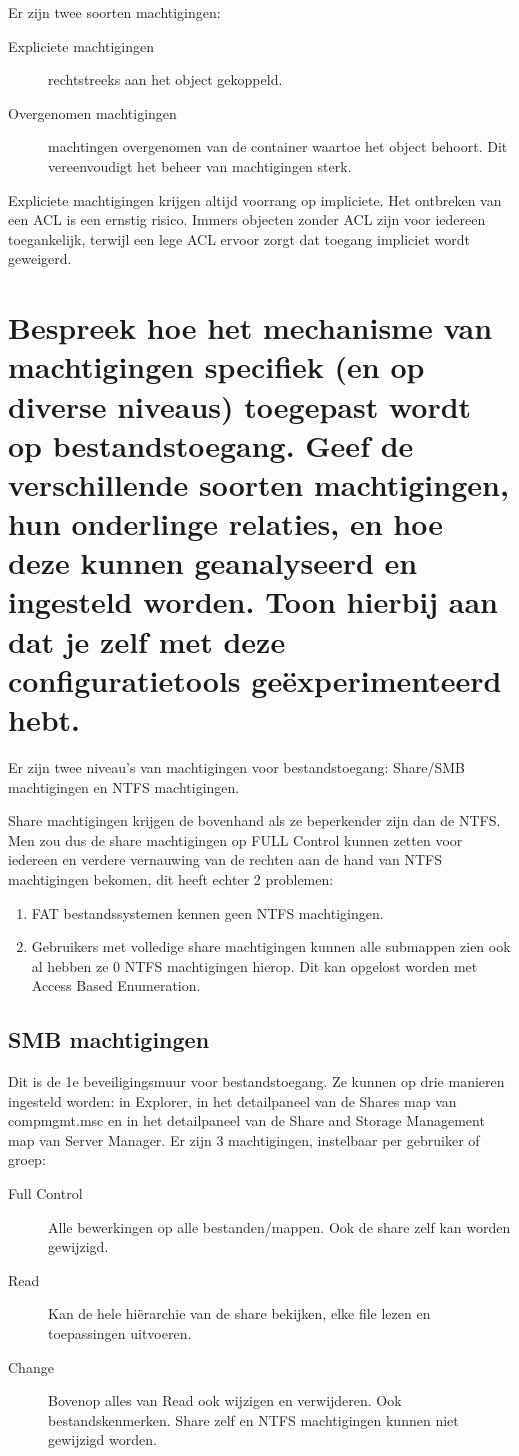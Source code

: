 Er zijn twee soorten machtigingen:
\begin{description}
	\item[Expliciete machtigingen] rechtstreeks aan het object gekoppeld.
	\item[Overgenomen machtigingen] machtingen overgenomen van de container
		waartoe het object behoort. Dit vereenvoudigt het beheer van
		machtigingen sterk.
\end{description}

Expliciete machtigingen krijgen altijd voorrang op impliciete. Het ontbreken van
een ACL is een ernstig risico. Immers objecten zonder ACL zijn voor iedereen
toegankelijk, terwijl een lege ACL ervoor zorgt dat toegang impliciet wordt
geweigerd.

\section{Bespreek hoe het mechanisme van machtigingen specifiek (en op diverse
niveaus) toegepast wordt op bestandstoegang. Geef de verschillende soorten
machtigingen, hun onderlinge relaties, en hoe deze kunnen geanalyseerd en
ingesteld worden. Toon hierbij aan dat je zelf met deze configuratietools
geëxperimenteerd hebt.}

Er zijn twee niveau's van machtigingen voor bestandstoegang: Share/SMB
machtigingen en NTFS machtigingen.

Share machtigingen krijgen de bovenhand als ze beperkender zijn dan de NTFS. Men
zou dus de share machtigingen op FULL Control kunnen zetten voor iedereen en
verdere vernauwing van de rechten aan de hand van NTFS machtigingen bekomen, dit
heeft echter 2 problemen:
\begin{enumerate}
	\item FAT bestandssystemen kennen geen NTFS machtigingen.
	\item Gebruikers met volledige share machtigingen kunnen alle submappen
		zien ook al hebben ze 0 NTFS machtigingen hierop. Dit kan
		opgelost worden met Access Based Enumeration.
\end{enumerate}

\subsection{SMB machtigingen}

Dit is de 1e beveiligingsmuur voor bestandstoegang. Ze kunnen op drie manieren
ingesteld worden: in Explorer, in het detailpaneel van de Shares map van
compmgmt.msc en in het detailpaneel van de Share and Storage Management map van
Server Manager. Er zijn 3 machtigingen, instelbaar per gebruiker of groep:
\begin{description}
	\item[Full Control] Alle bewerkingen op alle bestanden/mappen. Ook de
		share zelf kan worden gewijzigd.
	\item[Read] Kan de hele hiërarchie van de share bekijken, elke file
		lezen en toepassingen uitvoeren.
	\item[Change] Bovenop alles van Read ook wijzigen en verwijderen. Ook
		bestandskenmerken. Share zelf en NTFS machtigingen kunnen niet
		gewijzigd worden.
\end{description}

